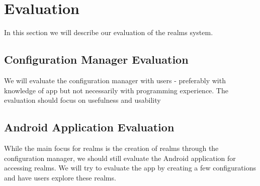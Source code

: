\section{Evaluation}
\label{sec.eval}
In this section we will describe our evaluation of the realms system.

\subsection{Configuration Manager Evaluation} %
\label{sub:configuration_manager_evaluation}
We will evaluate the configuration manager with users - preferably with knowledge of app but not necessarily with programming experience. The evaluation should focus on usefulness and usability

\subsection{Android Application Evaluation} %
\label{sub:android_application_evaluation}
While the main focus for realms is the creation of realms through the configuration manager, we should still evaluate the Android application for accessing realms. We will try to evaluate the app by creating a few configurations and have users explore these realms. 
